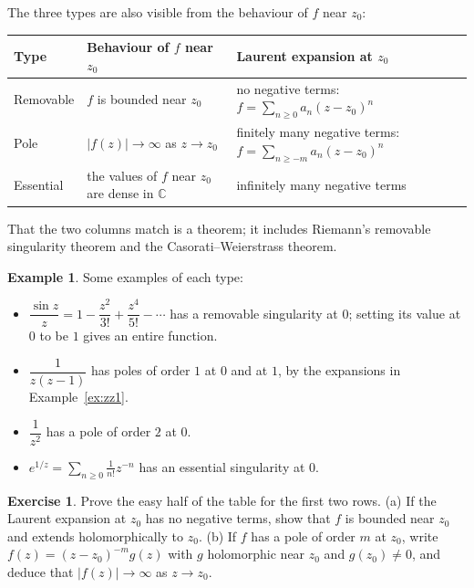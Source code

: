 \documentclass[11pt]{article}
\theoremstyle{plain}
\theoremstyle{definition}
\newtheorem{example}[theorem]{Example}
\newtheorem{exercise}[theorem]{Exercise}
\theoremstyle{remark}
\numberwithin{equation}{section}
\newcommand{\C}{\mathbb{C}}
\begin{document}
The three types are also visible from the behaviour of $f$ near $z_0$:

\begin{center}
\renewcommand{\arraystretch}{1.5}
\begin{tabular}{|l|p{5.2cm}|p{5.4cm}|}
 \hline
 \textbf{Type} & \textbf{Behaviour of $f$ near $z_0$} &
 \textbf{Laurent expansion at $z_0$}\\
 \hline
 Removable & $f$ is bounded near $z_0$ &
 no negative terms:\newline $f=\sum_{n\geq0}a_n(z-z_0)^n$\\
 \hline
 Pole & $|f(z)|\to\infty$ as $z\to z_0$ &
 finitely many negative terms:\newline $f=\sum_{n\geq-m}a_n(z-z_0)^n$\\
 \hline
 Essential & the values of $f$ near $z_0$ are dense in $\C$ &
 infinitely many negative terms\\
 \hline
\end{tabular}
\end{center}
That the two columns match is a theorem; it includes Riemann's removable
singularity theorem and the Casorati--Weierstrass theorem.

\begin{example}
Some examples of each type:
\begin{itemize}
 \item $\dfrac{\sin z}{z}=1-\dfrac{z^2}{3!}+\dfrac{z^4}{5!}-\cdots$ has a
 removable singularity at $0$; setting its value at $0$ to be $1$ gives an
 entire function.
 \item $\dfrac{1}{z(z-1)}$ has poles of order $1$ at $0$ and at $1$, by
 the expansions in Example~\ref{ex:zz1}.
 \item $\dfrac{1}{z^2}$ has a pole of order $2$ at $0$.
 \item $e^{1/z}=\displaystyle\sum_{n\geq0}\frac{1}{n!}z^{-n}$ has an
 essential singularity at $0$.
\end{itemize}
\end{example}

\begin{exercise}
Prove the easy half of the table for the first two rows. (a) If the
Laurent expansion at $z_0$ has no negative terms, show that $f$ is bounded
near $z_0$ and extends holomorphically to $z_0$. (b) If $f$ has a pole of
order $m$ at $z_0$, write $f(z)=(z-z_0)^{-m}g(z)$ with $g$ holomorphic near
$z_0$ and $g(z_0)\ne0$, and deduce that $|f(z)|\to\infty$ as $z\to z_0$.
\end{exercise}
\end{document}
